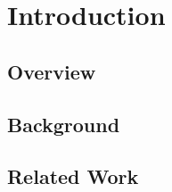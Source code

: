 \chapter{Introduction}
\label{chap:intro}

\section{Overview}

\section{Background}

\section{Related Work}
